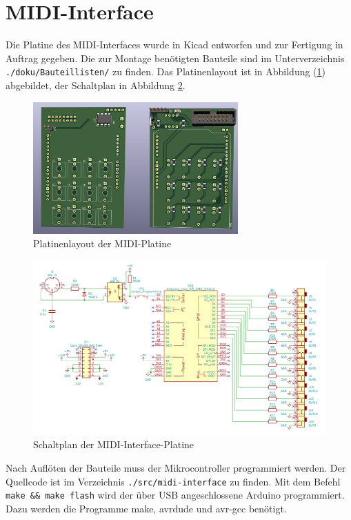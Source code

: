 \section{MIDI-Interface}
Die Platine des MIDI-Interfaces wurde in Kicad entworfen und zur Fertigung in Auftrag gegeben.
Die zur Montage benötigten Bauteile sind im Unterverzeichnis \texttt{./doku/Bauteillisten/} zu finden.
Das Platinenlayout ist in Abbildung (\ref{fig:midi-platine}) abgebildet, der Schaltplan in Abbildung \ref{fig:midi-schaltplan}.
\begin{figure}[h]
    \centering
\includegraphics[width=0.7\textwidth]{Images/midi-interface-geschnitten.png}
    \caption{Platinenlayout der MIDI-Platine}
    \label{fig:midi-platine}
\end{figure}
\begin{figure}[h]
    \centering
    \includegraphics[width=\linewidth]{Images/midi-interface-schematic.png}
    \caption{Schaltplan der MIDI-Interface-Platine}
    \label{fig:midi-schaltplan}
\end{figure}

Nach Auflöten der Bauteile muss der Mikrocontroller programmiert werden.
Der Quellcode ist im Verzeichnis \texttt{./src/midi-interface} zu finden.
Mit dem Befehl \texttt{make \&\& make flash} wird der über USB angeschlossene Arduino programmiert. Dazu werden die Programme make, avrdude und avr-gcc benötigt.

